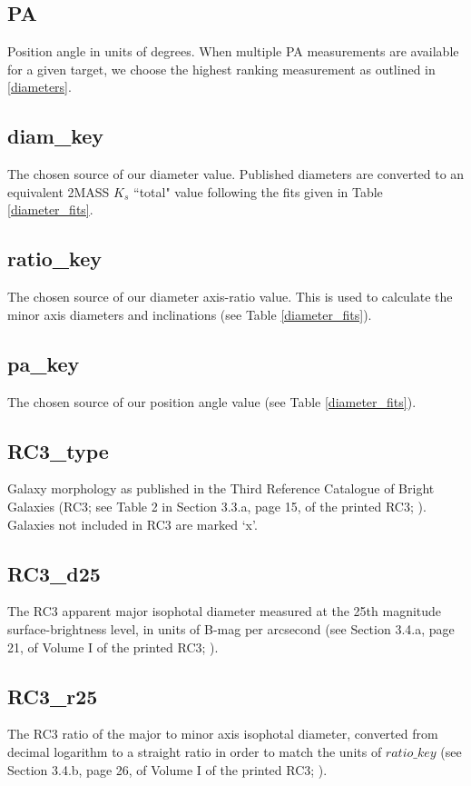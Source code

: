 \documentclass[twocolumn,tighten]{aastex62}
\begin{document}
\subsection{PA} \label{PA}
Position angle in units of degrees. When multiple PA measurements are available for a given target, we choose the highest ranking measurement as outlined in \ref{diameters}.

\subsection{diam\_key} \label{diameter_key}
The chosen source of our diameter value. Published diameters are converted to an equivalent 2MASS $K_s$ ``total" value following the fits given in Table \ref{diameter_fits}.

\subsection{ratio\_key} \label{ratio_key}
The chosen source of our diameter axis-ratio value. This is used to calculate the minor axis diameters and inclinations (see Table \ref{diameter_fits}).

\subsection{pa\_key} \label{pa_key}
The chosen source of our position angle value (see Table \ref{diameter_fits}).

\subsection{RC3\_type} \label{RC3_type}
Galaxy morphology as published in the Third Reference Catalogue of Bright Galaxies (RC3; see Table 2 in Section 3.3.a, page 15, of the printed RC3; \citealt{RC3}). Galaxies not included in RC3 are marked `x'.

\subsection{RC3\_d25} \label{RC3_d25}
The RC3 apparent major isophotal diameter measured at the 25th magnitude surface-brightness level, in units of B-mag per arcsecond (see Section 3.4.a, page 21, of Volume I of the printed RC3; \citealt{RC3}).

\subsection{RC3\_r25} \label{RC3_r25}
The RC3 ratio of the major to minor axis isophotal diameter, converted from decimal logarithm to a straight ratio in order to match the units of $ratio\_key$ (see Section 3.4.b, page 26, of Volume I of the printed RC3; \citealt{RC3}).
\end{document}
